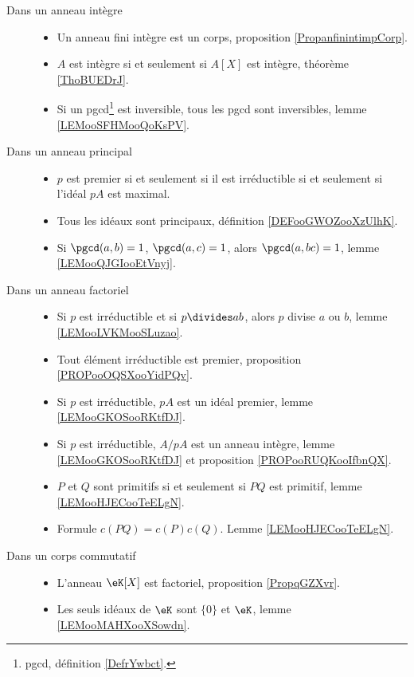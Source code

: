 \begin{description}
	\item[Dans un anneau intègre]\hspace{1cm}
	\begin{itemize}
		\item
		      Un anneau fini intègre est un corps, proposition \ref{PropanfinintimpCorp}.
		\item
		      \( A\) est intègre si et seulement si \( A[X]\) est intègre, théorème \ref{ThoBUEDrJ}.
		\item
		      Si un pgcd\footnote{pgcd, définition \ref{DefrYwbct}.} est inversible, tous les pgcd sont inversibles, lemme \ref{LEMooSFHMooQoKsPV}.
	\end{itemize}
	\item[Dans un anneau principal]\hspace{1cm}
	\begin{itemize}
		\item
		      \( p\) est premier si et seulement si il est irréductible si et seulement si l'idéal \( pA\) est maximal.
		\item
		      Tous les idéaux sont principaux, définition \ref{DEFooGWOZooXzUlhK}.
		\item
		      Si \( \pgcd(a,b)=1\), \( \pgcd(a,c)=1\), alors \( \pgcd(a,bc)=1\), lemme \ref{LEMooQJGIooEtVnyj}.
	\end{itemize}
	\item[Dans un anneau factoriel]\hspace{1cm}
	\begin{itemize}
		\item
		      Si \( p\) est irréductible et si \( p\divides ab\), alors \( p\) divise \( a\) ou \( b\), lemme \ref{LEMooLVKMooSLuzao}.
		\item
		      Tout élément irréductible est premier, proposition \ref{PROPooOQSXooYidPQv}.
		\item
		      Si \( p\) est irréductible, \( pA\) est un idéal premier, lemme \ref{LEMooGKOSooRKtfDJ}.
		\item
		      Si \( p\) est irréductible, \( A/pA\) est un anneau intègre, lemme \ref{LEMooGKOSooRKtfDJ} et proposition \ref{PROPooRUQKooIfbnQX}.
		\item
		      \( P\) et \( Q\) sont primitifs si et seulement si \( PQ\) est primitif, lemme \ref{LEMooHJECooTeELgN}.
		\item
		      Formule \( c(PQ)=c(P)c(Q)\). Lemme \ref{LEMooHJECooTeELgN}.
	\end{itemize}
	\item[Dans un corps commutatif]\hspace{1cm}
	\begin{itemize}
		\item
		      L'anneau \( \eK[X]\) est factoriel, proposition \ref{PropqGZXvr}.
		\item
		      Les seuls idéaux de \( \eK\) sont \( \{ 0 \}\) et \( \eK\), lemme \ref{LEMooMAHXooXSowdn}.
	\end{itemize}
\end{description}

